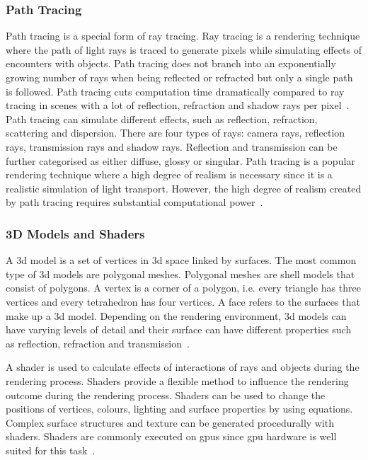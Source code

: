 \subsubsection{Path Tracing}
Path tracing is a special form of ray tracing. Ray tracing is a rendering technique where the path of light rays is traced to generate pixels while simulating effects of encounters with objects. Path tracing does not branch into an exponentially growing number of rays when being reflected or refracted but only a single path is followed. Path tracing cuts computation time dramatically compared to ray tracing in scenes with a lot of reflection, refraction and shadow rays per pixel~\cite{Kajiya1986TheEquation}. Path tracing can simulate different effects, such as reflection, refraction, scattering and dispersion. There are four types of rays: camera rays, reflection rays, transmission rays and shadow rays. Reflection and transmission can be further categorised as either diffuse, glossy or singular. Path tracing is a popular rendering technique where a high degree of realism is necessary since it is a realistic simulation of light transport. However, the high degree of realism created by path tracing requires substantial computational power~\cite{Vasiou2018ACost}.

\subsubsection{3D Models and Shaders}
A \gls{3d} model is a set of vertices in \gls{3d} space linked by surfaces. The most common type of \gls{3d} models are polygonal meshes. Polygonal meshes are shell models that consist of polygons. A vertex is a corner of a polygon, i.e. every triangle has three vertices and every tetrahedron has four vertices. A face refers to the surfaces that make up a \gls{3d} model. Depending on the rendering environment, \gls{3d} models can have varying levels of detail and their surface can have different properties such as reflection, refraction and transmission~\cite{FoundationCyclesIntroduction}.

A shader is used to calculate effects of interactions of rays and objects during the rendering process. Shaders provide a flexible method to influence the rendering outcome during the rendering process. Shaders can be used to change the positions of vertices, colours, lighting and surface properties by using equations. Complex surface structures and texture can be generated procedurally with shaders. Shaders are commonly executed on \glspl{gpu} since \gls{gpu} hardware is well suited for this task~\cite{Pharr2010ChapterMaterials, Sans2017ACUDA, Spath2018AdvancedThMAD}.

